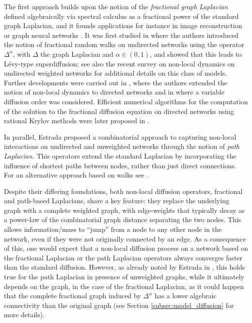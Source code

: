\documentclass[a4paper,12pt]{article}
\newcommand{\fL}{\Delta^\alpha}
\begin{document}
The first approach builds upon the notion of the \emph{fractional graph Laplacian} defined algebraically via spectral calculus as a fractional power of the standard graph Laplacian, and it founds applications for instance in image reconstruction \cite{Buccini_fractional_laplacian_image_reconstruction} or graph neural networks \cite{maskey2023fractional}. It was first studied in \cite{riascos2012levy,Riascos_introduction_of_fractional_laplacian} where the authors introduced the notion of fractional random walks on undirected networks using the operator $\Delta^\alpha$, with $\Delta$ the graph Laplacian and $\alpha \in (0,1)$, and showed that this leads to Lévy-type superdiffusion; see also the recent survey on non-local dynamics on undirected weighted networks \cite{Riascos_survey_nonlocal_dynamics} for additional details on this class of models. Further developments were carried out in \cite{Benzi_2020_fractional_laplacian}, where the authors extended the notion of non-local dynamics to
directed networks and in \cite{Bertaccini_Dustantante_nonlocal_varaible_index} where a variable diffusion order was considered. Efficient numerical algorithms for the computation of the solution to the fractional diffusion equation on directed networks using rational Krylov methods were later proposed in \cite{benzi2022rational}.

In parallel, Estrada \cite{estrada2012path_laplacian} proposed a combinatorial approach to capturing non-local interactions on undirected and unweighted networks through the notion of \emph{path Laplacian}. This operators extend the standard Laplacian by incorporating the influence of shortest paths between nodes, rather than just direct connections. For an alternative approach based on walks see \cite{ArrDur2026_walkbasedlaplaciansmodeling}.

Despite their differing foundations, both non-local diffusion operators, fractional and path-based Laplacians, share a key feature: they replace the underlying graph with a complete weighted graph, with edge-weights that typically decay as a power-law of the combinatorial graph distance separating the two nodes. This allows information/mass to ``jump'' from a node to any other node in the network, even if they were not originally connected by an edge. As a consequence of this, one would expect that a non-local diffusion process on a network based on the fractional Laplacian or the path Laplacian operators always converges faster than the standard diffusion. %
However, as already noted by Estrada in \cite{Estrada_2021_fractional_vs_path_laplacians}, this holds true for the path Laplacian in presence of unweighted graphs, while it ultimately depends on the graph, in the case of the fractional Laplacian, as it could happen that the complete fractional graph induced by $\fL$ has a lower algebraic connectivity than the original graph  (see Section \ref{subsec:model_diffusion} for more details).
\end{document}
